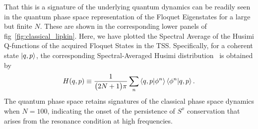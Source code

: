 \documentclass[%
reprint,
superscriptaddress,
amsmath,amssymb,
aps,
prb,
showkeys,
]{revtex4-2}
\providecommand{\DIFaddtex}[1]{{\protect\color{blue}\uwave{#1}}} %
\providecommand{\DIFaddbegin}{} %
\providecommand{\DIFaddend}{} %
\providecommand{\DIFdelbegin}{} %
\providecommand{\DIFadd}[1]{\texorpdfstring{\DIFaddtex{#1}}{#1}} %
\newcommand{\DIFscaledelfig}{0.5}
\newlength{\DIFdelgraphicswidth} %
\newlength{\DIFdelgraphicsheight} %
\newcommand{\DIFaddincludegraphics}[2][]{{\color{blue}\fbox{\DIFOincludegraphics[#1]{#2}}}} %
\newcommand{\DIFdelincludegraphics}[2][]{%
\sbox{\DIFdelgraphicsbox}{\DIFOincludegraphics[#1]{#2}}%
\settoboxwidth{\DIFdelgraphicswidth}{\DIFdelgraphicsbox} %
\settoboxtotalheight{\DIFdelgraphicsheight}{\DIFdelgraphicsbox} %
\scalebox{\DIFscaledelfig}{%
\parbox[b]{\DIFdelgraphicswidth}{\usebox{\DIFdelgraphicsbox}\\[-\baselineskip] \rule{\DIFdelgraphicswidth}{0em}}\llap{\resizebox{\DIFdelgraphicswidth}{\DIFdelgraphicsheight}{%
\setlength{\unitlength}{\DIFdelgraphicswidth}%
\begin{picture}(1,1)%
\thicklines\linethickness{2pt} %
{\color[rgb]{1,0,0}\put(0,0){\framebox(1,1){}}}%
{\color[rgb]{1,0,0}\put(0,0){\line( 1,1){1}}}%
{\color[rgb]{1,0,0}\put(0,1){\line(1,-1){1}}}%
\end{picture}%
}\hspace*{3pt}}} %
} %
\DeclareRobustCommand{\DIFaddbegin}{\DIFOaddbegin \let\includegraphics\DIFaddincludegraphics} %
\DeclareRobustCommand{\DIFaddend}{\DIFOaddend \let\includegraphics\DIFOincludegraphics} %
\DeclareRobustCommand{\DIFdelbegin}{\DIFOdelbegin \let\includegraphics\DIFdelincludegraphics} %
\begin{document}
That this is a signature of the underlying quantum dynamics can be readily seen in the quantum phase space representation of the Floquet Eigenstates for a large but finite $N$. These are shown in the corresponding lower panels of fig\DIFaddbegin \DIFadd{.}\DIFaddend ~\ref{fig:classical_lipkin}. Here, we have plotted the Spectral Average of the Husimi Q-functions of the acquired Floquet States in the TSS. Specifically, for a coherent state $\ket{q,p}$, the corresponding Spectral-Averaged Husimi distribution~\cite{husimi} is obtained by 
\begin{equation}
	H(q,p)\equiv \frac{1}{\big(2N+1\big)\pi}\sum_n \ip{q,p}{\phi^n}\ip{\phi^n}{q,p}.
	\label{eq:husimi}
\end{equation}
The quantum phase space retains signatures of the classical phase space dynamics when $N=100$, indicating the onset of the persistence of $S^x$ conservation that arises from the resonance condition at high frequencies. 
\DIFdelbegin %
\end{document}
